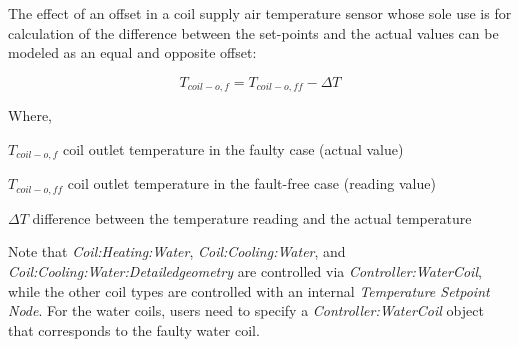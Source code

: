 The effect of an offset in a coil supply air temperature sensor whose sole use is for calculation of the difference between the set-points and the actual values can be modeled as an equal and opposite offset:

\begin{equation}
T_{coil-o,f} = T_{coil-o,ff} - \Delta T
\end{equation}

Where,

\(T_{coil-o,f}\) coil outlet temperature in the faulty case (actual value)

\(T_{coil-o,ff}\) coil outlet temperature in the fault-free case (reading value)

\(\Delta T\) difference between the temperature reading and the actual temperature

Note that \emph{Coil:Heating:Water}, \emph{Coil:Cooling:Water}, and \emph{Coil:Cooling:Water:Detailedgeometry} are controlled via \emph{Controller:WaterCoil}, while the other coil types are controlled with an internal \emph{Temperature Setpoint Node}. For the water coils, users need to specify a \emph{Controller:WaterCoil} object that corresponds to the faulty water coil.

